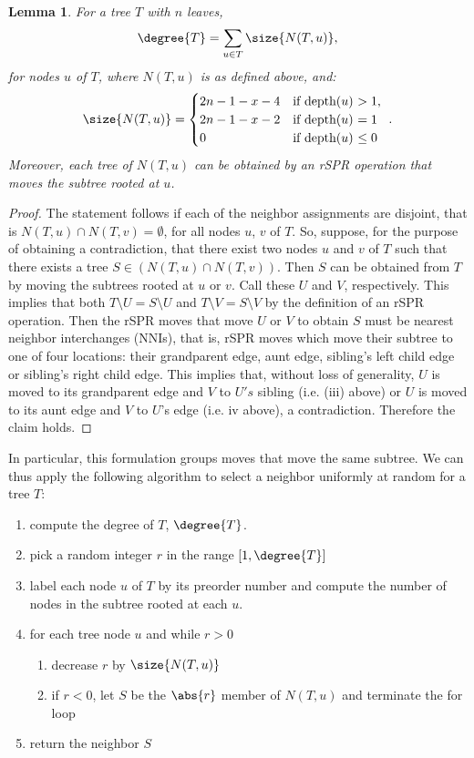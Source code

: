 \documentclass[11pt,onecolumn,conference]{IEEEtran}
\newtheorem{lemma}[theorem]{Lemma}
\begin{document}
\begin{lemma}
	\label{lem:compute_degree}
	For a tree $T$ with $n$ leaves,
	$$\degree{T} = \sum_{u \in T} \size{N(T,u)},$$
	for nodes $u$ of $T$, where $N(T,u)$ is as defined above, and:
	$$\size{N(T,u)} = \begin{cases}
		2n - 1 - x - 4 &\text{if depth($u$) $ > 1$, } \\
		2n - 1 - x - 2 &\text{if depth($u$) $ = 1$ } \\
		0 &\text{if depth($u$) $ \le 0$ } \\
	\end{cases}.$$
	Moreover, each tree of $N(T,u)$ can be obtained by an rSPR operation that moves the subtree rooted at $u$.
\end{lemma}
\begin{proof}
	The statement follows if each of the neighbor assignments are disjoint, that is $N(T,u) \cap N(T,v) = \emptyset$, for all nodes $u$, $v$ of $T$.
	So, suppose, for the purpose of obtaining a contradiction, that there exist two nodes $u$ and $v$ of $T$ such that there exists a tree $S \in (N(T,u) \cap N(T,v))$.
	Then $S$ can be obtained from $T$ by moving the subtrees rooted at $u$ or $v$.
	Call these $U$ and $V$, respectively.
	This implies that both $T \setminus U = S \setminus U$ and $T \setminus V = S \setminus V$ by the definition of an rSPR operation.
	Then the rSPR moves that move $U$ or $V$ to obtain $S$ must be nearest neighbor interchanges (NNIs), that is, rSPR moves which move their subtree to one of four locations: their grandparent edge, aunt edge, sibling's left child edge or sibling's right child edge.
	This implies that, without loss of generality, $U$ is moved to its grandparent edge and $V$ to $U's$ sibling (i.e. (iii) above) or $U$ is moved to its aunt edge and $V$ to $U$'s edge (i.e. iv above), a contradiction.
	Therefore the claim holds.
\end{proof}


In particular, this formulation groups moves that move the same subtree.
We can thus apply the following algorithm to select a neighbor uniformly at random for a tree $T$:

\begin{enumerate}[label={\arabic*}.]
	\item	compute the degree of $T$, $\degree{T}$.
	\item pick a random integer $r$ in the range $[1,\degree{T}]$
	\item label each node $u$ of $T$ by its preorder number and compute the number of nodes in the subtree rooted at each $u$.
\item for each tree node $u$ and while $r > 0$
	\begin{enumerate}
		\item decrease $r$ by $\size{N(T,u)}$
		\item if $r < 0$, let $S$ be the $\abs{r}$ member of $N(T,u)$ and terminate the for loop
	\end{enumerate}
\item return the neighbor $S$
\end{enumerate}
\end{document}
